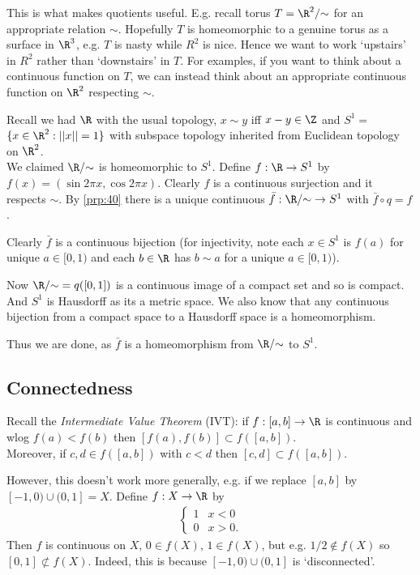 \begin{remark}
This is what makes quotients useful. 
E.g. recall torus $T = \R^2/ {\sim}$ for an appropriate relation $\sim$.
Hopefully $T$ is homeomorphic to a genuine torus as a surface in $\R^3$, e.g. $T$ is nasty while $R^2$ is nice. 
Hence we want to work `upstairs' in $R^2$ rather than `downstairs' in $T$. 
For examples, if you want to think about a continuous function on $T$, we can instead think about an appropriate continuous function on $\R^2$ respecting $\sim$.
\end{remark}

\begin{example}
Recall we had $\R$ with the usual topology, $x\sim y$ iff $x-y\in \Z$ and $S^1= $ $ \Set{x\in \R^2}{||x||=1}$ with subspace topology inherited from Euclidean topology on $\R^2$. \\
We claimed $\R/ {\sim}$ is homeomorphic to $S^1$. Define $f:\R \to S^1$ by $f(x) = (\sin 2\pi x, \cos 2\pi x)$.
Clearly $f$ is a continuous surjection and it respects $\sim$. 
By \cref{prp:40} there is a unique continuous $\bar{f}: \R/ {\sim} \to S^1$ with $\bar{f}\circ q = f$.

Clearly $\bar{f}$ is a continuous bijection (for injectivity, note each $x\in S^1$ is $f(a)$ for unique $a\in[0,1)$ and each $b\in \R$ has $b\sim a$ for a unique $a\in[0,1)$).

Now $\R/ {\sim} = q([0,1])$ is a continuous image of a compact set and so is compact. And $S^1$ is Hausdorff as its a metric space. 
We also know that any continuous bijection from a compact space to a Hausdorff space is a homeomorphism.

Thus we are done, as $\bar{f}$ is a homeomorphism from $\R/ {\sim}$ to $S^1$.
\end{example}

\subsection{Connectedness}

Recall the \emph{Intermediate Value Theorem} (IVT): if $f:[a,b]\to \R$ is continuous and wlog $f(a)<f(b)$ then $[f(a),f(b)]\subset f([a,b])$. \\
Moreover, if $c,d \in f([a,b])$ with $c<d$ then $[c,d]\subset f([a,b])$. 

However, this doesn't work more generally, e.g. if we replace $[a,b]$ by $[-1,0)\cup (0,1] = X$. Define $f:X\to \R$ by \begin{align*}
    \begin{cases}
        1 & x<0\\
        0 & x>0.
    \end{cases}
\end{align*} 
Then $f$ is continuous on $X$, $0\in f(X)$, $1\in f(X)$, but e.g. $1/2 \not\in f(X)$ so $[0,1] \not\subset f(X)$. Indeed, this is because $[-1,0)\cup (0,1]$ is `disconnected'.

